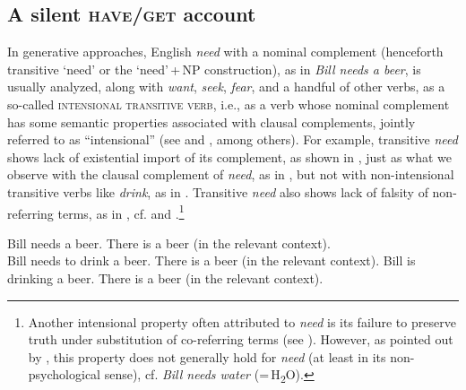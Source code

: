 \documentclass[output=paper]{langscibook}
\begin{document}
\subsection{A silent \textsc{have/get} account}\label{section-silent-have}

In generative approaches, English \textit{need} with a nominal complement (henceforth transitive `need' or the `need'\,+\,NP construction), as in \textit{Bill needs a beer}, is usually analyzed, along with \textit{want}, \textit{seek}, \textit{fear}, and a handful of other verbs, as a so-called \textsc{intensional transitive verb}, i.e., as a verb whose nominal complement has some semantic properties associated with clausal complements, jointly referred to as ``intensional'' (see \citealt{denDikken.Larson.Ludlow2018} and \citealt{Schwarz2006}, among others). For example, transitive \textit{need} shows lack of existential import of its complement, as shown in , just as what we observe with the clausal complement of \textit{need}, as in , but not with non-intensional transitive verbs like \textit{drink}, as in . Transitive \textit{need} also shows lack of falsity of non-referring terms, as in , cf.  and .\footnote{Another intensional property often attributed to \textit{need} is its failure to preserve truth under substitution of co-referring terms (see \citealt{denDikken.Larson.Ludlow2018,Harves2008}). However, as pointed out by \citet{Forbes2020}, this property does not generally hold for \textit{need} (at least in its non-psychological sense), cf. \textit{Bill needs water} (=\,H\textsubscript{2}O).}

\ea
\ea Bill needs a beer. {\nRightarrow} There is a beer (in the relevant context).\label{need-intensional}\\ \hfill \citep[259]{Schwarz2006}
\ex Bill needs to drink a beer. {\nRightarrow} There is a beer (in the relevant context).\label{need-infinitival}
\ex Bill is drinking a beer. {\Rightarrow} There is a beer  (in the relevant context).\label{non-intensional}
\z

\end{document}
